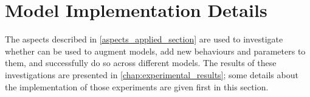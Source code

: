 



\section{Model Implementation Details}
\label{sec:optimisation_with_aspects_experimental_design}



The aspects described in \cref{aspects_applied_section} are used to investigate
whether \aop{} can be used to augment models, add new behaviours and parameters
to them, and successfully do so across different models. The results of these
investigations are presented in \cref{chap:experimental_results}; some details
about the implementation of those experiments are given first in this section.


